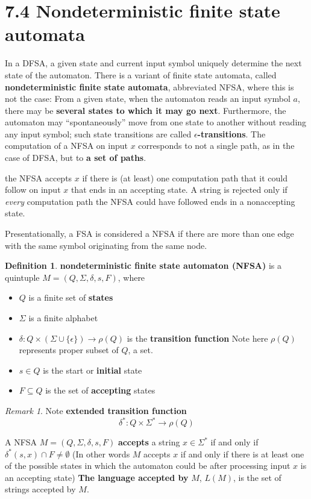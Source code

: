 \documentclass[11pt]{article}
\theoremstyle{plain}%
\theoremstyle{definition}
\newtheorem{defn}{Definition}
\theoremstyle{remark}
\newtheorem*{rem}{Remark}
\begin{document}
\section*{7.4 Nondeterministic finite state automata}

In a DFSA, a given state and current input symbol uniquely determine the next state of the automaton. There is a variant of finite state automata, called \textbf{nondeterministic finite state automata}, abbreviated NFSA, where this is not the case: From a given state, when the automaton reads an input symbol $a$, there may be \textbf{several states to which it may go next}. Furthermore, the automaton may “spontaneously” move from one state to another without reading any input symbol; such state transitions are called \textbf{$ \epsilon$-transitions}. The computation of a NFSA on input $x$ corresponds to not a single path, as in the case of DFSA, but to \textbf{a set of paths}.

the NFSA accepts $x$ if there is (at least) one computation path that it could follow on input $x$ that ends in an accepting state. A string is rejected only if \textit{every} computation path the NFSA could have followed ends in a nonaccepting state.

Presentationally, a FSA is considered a NFSA if there are more than one edge with the same symbol originating from the same node.


\begin{defn}
  \textbf{nondeterministic finite state automaton (NFSA)} is a quintuple $M=(Q, \Sigma, \delta, s, F)$, where
  \begin{itemize}
    \item $Q$ is a finite set of \textbf{states}
    \item $\Sigma$ is a finite alphabet
    \item $\delta: Q\times (\Sigma \cup \{ \epsilon \}) \rightarrow \rho (Q)$ is the \textbf{transition function} Note here $\rho (Q)$ represents proper subset of $Q$, a set.
    \item $s\in Q$ is the start or \textbf{initial} state
    \item $F\subseteq Q$ is the set of \textbf{accepting} states
  \end{itemize}
  \begin{rem}
    Note \textbf{extended transition function}
    \[
      \delta^*: Q\times \Sigma^* \rightarrow \rho(Q)
    \]
  \end{rem}
  A NFSA $M=(Q, \Sigma, \delta, s, F)$ \textbf{accepts} a string $x\in \Sigma^*$ if and only if $\delta^*(s,x)\cap F\neq \emptyset$ (In other words $M$ accepts $x$ if and only if there is at least one of the possible states in which the automaton could be after processing input $x$ is an accepting state) \textbf{The language accepted by} $M$, $L(M)$, is the set of strings accepted by $M$.
\end{defn}
\end{document}
